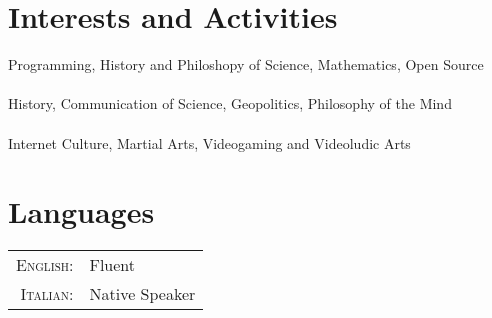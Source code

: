 \documentclass[a4paper,10pt]{article} %
\begin{document}

\section{Interests and Activities}

{\large Programming, History and Philoshopy of Science, Mathematics, Open Source\\
\\
History, Communication of Science, Geopolitics, Philosophy of the Mind\\
\\
Internet Culture, Martial Arts, Videogaming and Videoludic Arts}


\section{Languages}

\begin{tabular}{rl}
	\textsc{English:} & Fluent\\
	
	\textsc{Italian:} & Native Speaker\\
	
\end{tabular}
\end{document}

